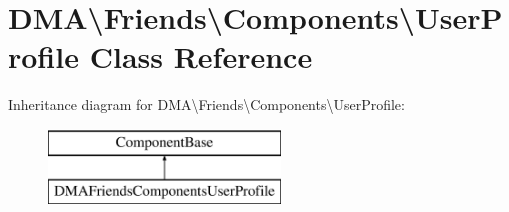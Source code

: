 \hypertarget{classDMA_1_1Friends_1_1Components_1_1UserProfile}{}\section{D\+M\+A\textbackslash{}Friends\textbackslash{}Components\textbackslash{}User\+Profile Class Reference}
\label{classDMA_1_1Friends_1_1Components_1_1UserProfile}
Inheritance diagram for D\+M\+A\textbackslash{}Friends\textbackslash{}Components\textbackslash{}User\+Profile\+:\begin{figure}[H]
\begin{center}
\leavevmode
\includegraphics[height=2.000000cm]{de/dfc/classDMA_1_1Friends_1_1Components_1_1UserProfile}
\end{center}
\end{figure}
